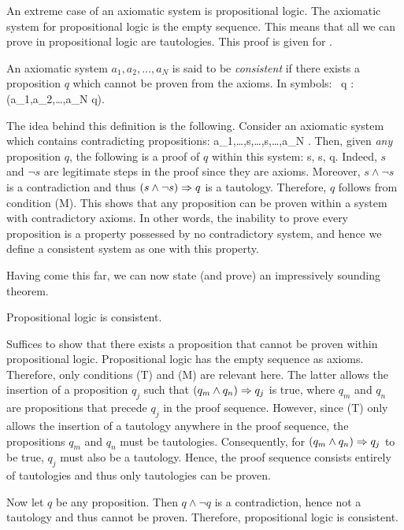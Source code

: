 An extreme case of an axiomatic system is propositional logic.
The axiomatic system for propositional logic is the empty sequence.
This means that all we can prove in propositional logic are tautologies. This
proof is given for .

\bd
An axiomatic system $a_1,a_2,\ldots,a_N$ is said to be \emph{consistent} if there exists a proposition $q$ which cannot be proven from the axioms.
In symbols:
\bse
\exists \, q : \neg (a_1,a_2,\ldots,a_N \vdash q).
\ese
\ed

The idea behind this definition is the following.
Consider an axiomatic system which contains contradicting propositions:
\bse
a_1,\ldots,s,\ldots,\neg s,\ldots,a_N .
\ese
Then, given \emph{any} proposition $q$, the following is a proof of $q$ within this system:
\bse
s, \neg s, q.
\ese
Indeed, $s$ and $\neg s$ are legitimate steps in the proof since they are axioms.
Moreover, $s\land \neg s$ is a contradiction and thus $(s\land \neg s) \Rightarrow q$ is a tautology.
Therefore, $q$ follows from condition (M).
This shows that any proposition can be proven within a system with contradictory axioms.
In other words, the inability to prove every proposition is a property possessed by no contradictory system, and hence we define a consistent system as one with this property.

Having come this far, we can now state (and prove) an impressively sounding theorem.

\bt
Propositional logic is consistent. \label{thm:prop_logic_is_consitent}
\et

\bq
Suffices to show that there exists a proposition that cannot be proven within propositional logic. Propositional logic has the empty sequence as axioms.
Therefore, only conditions (T) and (M) are relevant here.
The latter allows the insertion of a proposition $q_j$ such that $(q_m\land q_n) \Rightarrow q_j$ is true, where $q_m$ and $q_n$ are propositions that precede $q_j$ in the proof sequence.
However, since (T) only allows the insertion of a tautology anywhere in the proof sequence, the propositions $q_m$ and $q_n$ must be tautologies.
Consequently, for $(q_m\land q_n) \Rightarrow q_j$ to be true, $q_j$ must also be a tautology.
Hence, the proof sequence consists entirely of tautologies and thus only tautologies can be proven.

Now let $q$ be any proposition.
Then $q\land \neg q$ is a contradiction, hence not a tautology and thus cannot be proven.
Therefore, propositional logic is consistent.
\eq

